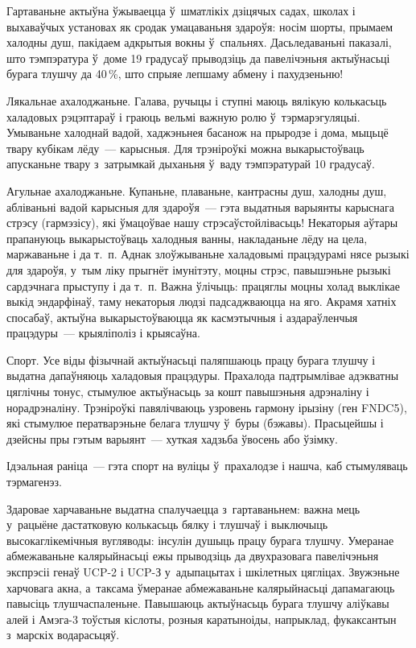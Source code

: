 Гартаваньне актыўна ўжываецца ў~шматлікіх дзіцячых садах, школах і выхаваўчых установах як сродак умацаваньня здароўя: носім шорты, прымаем халодны душ, пакідаем адкрытыя вокны ў~спальнях. Дасьледаваньні паказалі, што тэмпэратура ў~доме 19 градусаў прыводзіць да павелічэньня актыўнасьці бурага тлушчу да 40\,\%, што спрыяе лепшаму абмену і пахудзеньню!

Лякальнае ахалоджаньне. Галава, ручыцы і ступні маюць вялікую колькасьць халадовых рэцэптараў і граюць вельмі важную ролю ў~тэрмарэгуляцыі. Умываньне халоднай вадой, хаджэньнея басанож на прыродзе і дома, мыцьцё твару кубікам лёду~--- карысныя. Для трэніроўкі можна выкарыстоўваць апусканьне твару з~затрымкай дыханьня ў~ваду тэмпэратурай 10 градусаў.

Агульнае ахалоджаньне. Купаньне, плаваньне, кантрасны душ, халодны душ, абліваньні вадой карысныя для здароўя~--- гэта выдатныя варыянты карыснага стрэсу (гармэзісу), які ўмацоўвае нашу стрэсаўстойлівасьць! Некаторыя аўтары прапануюць выкарыстоўваць халодныя ванны, накладаньне лёду на цела, маржаваньне і да т.~п. Аднак злоўжываньне халадовымі працэдурамі нясе рызыкі для здароўя, у~тым ліку прыгнёт імунітэту, моцны стрэс, павышэньне рызыкі сардэчнага прыступу і да т.~п. Важна ўлічыць: працяглы моцны холад выклікае выкід эндарфінаў, таму некаторыя людзі падсаджваюцца на яго. Акрамя хатніх спосабаў, актыўна выкарыстоўваюцца як касмэтычныя і аздараўленчыя працэдуры~--- крыяліполіз і крыясаўна.

Спорт. Усе віды фізычнай актыўнасьці паляпшаюць працу бурага тлушчу і выдатна дапаўняюць халадовыя працэдуры. Прахалода падтрымлівае адэкватны цяглічны тонус, стымулюе актыўнасьць за кошт павышэньня адрэналіну і норадрэналіну. Трэніроўкі павялічваюць узровень гармону ірызіну (ген FNDC5), які стымулюе ператварэньне белага тлушчу ў~буры (бэжавы). Прасьцейшы і дзейсны пры гэтым варыянт~--- хуткая хадзьба ўвосень або ўзімку.

Ідэальная раніца~--- гэта спорт на вуліцы ў~прахалодзе і нашча, каб стымуляваць тэрмагенэз.

Здаровае харчаваньне выдатна спалучаецца з~гартаваньнем: важна мець у~рацыёне дастатковую колькасьць бялку і тлушчаў і выключыць высокаглікемічныя вугляводы: інсулін душыць працу бурага тлушчу. Умеранае абмежаваньне калярыйнасьці ежы прыводзіць да двухразовага павелічэньня экспрэсіі генаў UCP-2 і UCP-З у~адыпацытах і шкілетных цягліцах. Звужэньне харчовага акна, а~таксама ўмеранае абмежаваньне калярыйнасьці дапамагаюць павысіць тлушчаспаленьне. Павышаюць актыўнасьць бурага тлушчу аліўкавы алей і Амэга-3 тоўстыя кіслоты, розныя каратыноіды, напрыклад, фукаксантын з~марскіх водарасьцяў.

